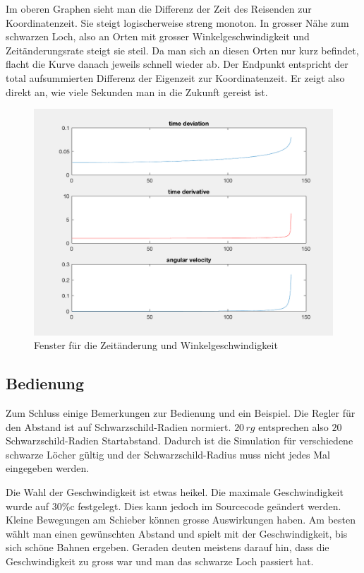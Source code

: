 \begin{refsection}
    Im oberen Graphen sieht man die Differenz der Zeit des Reisenden zur Koordinatenzeit. Sie steigt logischerweise streng monoton. In grosser Nähe zum schwarzen Loch, also an Orten mit grosser Winkelgeschwindigkeit und Zeitänderungsrate steigt sie steil. Da man sich an diesen Orten nur kurz befindet, flacht die Kurve danach jeweils schnell wieder ab. Der Endpunkt entspricht der total aufsummierten Differenz der Eigenzeit zur Koordinatenzeit. Er zeigt also direkt an, wie viele Sekunden man in die Zukunft gereist ist.
      \begin{figure}
        \centering
        \includegraphics[width=12cm]{zeitreisen/time.png}
        \caption{Fenster für die Zeitänderung und Winkelgeschwindigkeit}
        \label{skript:zeitreisen:fig:time} 
    \end{figure}
    
    \subsection{Bedienung}
    
    Zum Schluss einige Bemerkungen zur Bedienung und ein Beispiel. 
    Die Regler für den Abstand ist auf Schwarzschild-Radien normiert. $20\,rg$ entsprechen also $20$ Schwarzschild-Radien Startabstand. Dadurch ist die Simulation für verschiedene schwarze Löcher gültig und der Schwarzschild-Radius muss nicht jedes Mal eingegeben werden.
    
    Die Wahl der Geschwindigkeit ist etwas heikel. Die maximale Geschwindigkeit wurde auf 30\%c festgelegt. Dies kann jedoch im Sourcecode geändert werden. Kleine Bewegungen am Schieber können grosse Auswirkungen haben. Am besten wählt man einen gewünschten Abstand und spielt mit der Geschwindigkeit, bis sich schöne Bahnen ergeben. Geraden deuten meistens darauf hin, dass die Geschwindigkeit zu gross war und man das schwarze Loch passiert hat.
    

\end{refsection}
